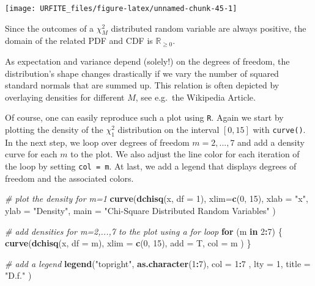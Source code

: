\documentclass[]{book}
\newenvironment{Shaded}{\begin{snugshade}}{\end{snugshade}}
\newcommand{\KeywordTok}[1]{\textcolor[rgb]{0.13,0.29,0.53}{\textbf{#1}}}
\newcommand{\DataTypeTok}[1]{\textcolor[rgb]{0.13,0.29,0.53}{#1}}
\newcommand{\DecValTok}[1]{\textcolor[rgb]{0.00,0.00,0.81}{#1}}
\newcommand{\StringTok}[1]{\textcolor[rgb]{0.31,0.60,0.02}{#1}}
\newcommand{\CommentTok}[1]{\textcolor[rgb]{0.56,0.35,0.01}{\textit{#1}}}
\newcommand{\ControlFlowTok}[1]{\textcolor[rgb]{0.13,0.29,0.53}{\textbf{#1}}}
\newcommand{\OperatorTok}[1]{\textcolor[rgb]{0.81,0.36,0.00}{\textbf{#1}}}
\newcommand{\NormalTok}[1]{#1}
\theoremstyle{definition}
\theoremstyle{definition}
\theoremstyle{definition}
\theoremstyle{remark}
\begin{document}
\begin{center}\texttt{[image: URFITE\_files/figure-latex/unnamed-chunk-45-1]} \end{center}

Since the outcomes of a \(\chi^2_M\) distributed random variable are
always positive, the domain of the related PDF and CDF is
\(\mathbb{R}_{\geq0}\).

As expectation and variance depend (solely!) on the degrees of freedom,
the distribution's shape changes drastically if we vary the number of
squared standard normals that are summed up. This relation is often
depicted by overlaying densities for different \(M\), see e.g.~the
Wikipedia Article.

Of course, one can easily reproduce such a plot using \texttt{R}. Again
we start by plotting the density of the \(\chi_1^2\) distribution on the
interval \([0,15]\) with \texttt{curve()}. In the next step, we loop
over degrees of freedom \(m=2,...,7\) and add a density curve for each
\(m\) to the plot. We also adjust the line color for each iteration of
the loop by setting \texttt{col = m}. At last, we add a legend that
displays degrees of freedom and the associated colors.

\begin{Shaded}
\begin{Highlighting}[]
\CommentTok{# plot the density for m=1}
\KeywordTok{curve}\NormalTok{(}\KeywordTok{dchisq}\NormalTok{(x, }\DataTypeTok{df =} \DecValTok{1}\NormalTok{), }
      \DataTypeTok{xlim=}\KeywordTok{c}\NormalTok{(}\DecValTok{0}\NormalTok{, }\DecValTok{15}\NormalTok{), }
      \DataTypeTok{xlab =} \StringTok{"x"}\NormalTok{, }
      \DataTypeTok{ylab =} \StringTok{"Density"}\NormalTok{, }
      \DataTypeTok{main =} \StringTok{"Chi-Square Distributed Random Variables"}
\NormalTok{      )}

\CommentTok{# add densities for m=2,...,7 to the plot using a for loop }
\ControlFlowTok{for}\NormalTok{ (m }\ControlFlowTok{in} \DecValTok{2}\OperatorTok{:}\DecValTok{7}\NormalTok{) \{}
  \KeywordTok{curve}\NormalTok{(}\KeywordTok{dchisq}\NormalTok{(x, }\DataTypeTok{df =}\NormalTok{ m),}
        \DataTypeTok{xlim =} \KeywordTok{c}\NormalTok{(}\DecValTok{0}\NormalTok{, }\DecValTok{15}\NormalTok{), }
        \DataTypeTok{add =}\NormalTok{ T, }
        \DataTypeTok{col =}\NormalTok{ m}
\NormalTok{        )}
\NormalTok{\}}

\CommentTok{# add a legend}
\KeywordTok{legend}\NormalTok{(}\StringTok{"topright"}\NormalTok{, }
       \KeywordTok{as.character}\NormalTok{(}\DecValTok{1}\OperatorTok{:}\DecValTok{7}\NormalTok{), }
       \DataTypeTok{col =} \DecValTok{1}\OperatorTok{:}\DecValTok{7}\NormalTok{ , }
       \DataTypeTok{lty =} \DecValTok{1}\NormalTok{, }
       \DataTypeTok{title =} \StringTok{"D.f."}
\NormalTok{       )}
\end{Highlighting}
\end{Shaded}
\end{document}
